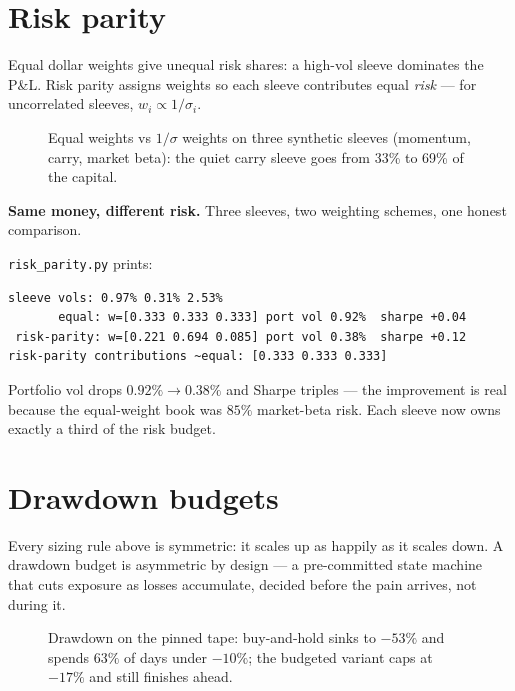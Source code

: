 \section{Risk parity}\label{sec:riskparity}

Equal dollar weights give unequal risk shares: a high-vol sleeve
dominates the P\&L. Risk parity assigns weights so each sleeve
contributes equal \emph{risk} --- for uncorrelated sleeves,
$w_i\propto 1/\sigma_i$.

\begin{figure}[htbp]\centering

\caption{Equal weights vs $1/\sigma$ weights on three synthetic
sleeves (momentum, carry, market beta): the quiet carry sleeve
goes from 33\% to 69\% of the capital.}
\label{fig:weights}
\end{figure}

\begin{example}\label{ex:rp}
\textbf{Same money, different risk.} Three sleeves, two weighting
schemes, one honest comparison.
\begin{solution}
\texttt{risk\_parity.py} prints:
\begin{verbatim}
sleeve vols: 0.97% 0.31% 2.53%
       equal: w=[0.333 0.333 0.333] port vol 0.92%  sharpe +0.04
 risk-parity: w=[0.221 0.694 0.085] port vol 0.38%  sharpe +0.12
risk-parity contributions ~equal: [0.333 0.333 0.333]
\end{verbatim}
Portfolio vol drops $0.92\%\to0.38\%$ and Sharpe triples ---
the improvement is real because the equal-weight book was
$85\%$ market-beta risk. Each sleeve now owns exactly a third
of the risk budget.
\end{solution}
\end{example}

\section{Drawdown budgets}\label{sec:ddbudget}

Every sizing rule above is symmetric: it scales up as happily as
it scales down. A drawdown budget is asymmetric by design ---
a pre-committed state machine that cuts exposure as losses
accumulate, decided before the pain arrives, not during it.

\begin{figure}[htbp]\centering

\caption{Drawdown on the pinned tape: buy-and-hold sinks to
$-53\%$ and spends $63\%$ of days under $-10\%$; the budgeted
variant caps at $-17\%$ and still finishes ahead.}
\label{fig:dd16}
\end{figure}

